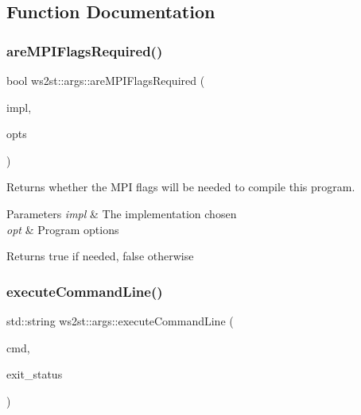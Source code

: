 \subsection{Function Documentation}
\mbox{\label{namespacews2st_1_1args_afdfeac88d594e9f636a020e576e99505}} 
\subsubsection{\texorpdfstring{are\+M\+P\+I\+Flags\+Required()}{areMPIFlagsRequired()}}
{\footnotesize\ttfamily bool ws2st\+::args\+::are\+M\+P\+I\+Flags\+Required (\begin{DoxyParamCaption}\item[{\mbox{\hyperlink{common_8hpp_aad9d1428f17c06ff77ef15dea22624dc}{Implementations}}}]{impl,  }\item[{const \mbox{\hyperlink{structWashOptions}{Wash\+Options}} \&}]{opts }\end{DoxyParamCaption})}



Returns whether the M\+PI flags will be needed to compile this program. 


\begin{DoxyParams}{Parameters}
{\em impl} & The implementation chosen \\
\hline
{\em opt} & Program options \\
\hline
\end{DoxyParams}
\begin{DoxyReturn}{Returns}
true if needed, false otherwise 
\end{DoxyReturn}
\mbox{\label{namespacews2st_1_1args_a759526679dc8b6662355746dfd34e586}} 
\subsubsection{\texorpdfstring{execute\+Command\+Line()}{executeCommandLine()}\hspace{0.1cm}{\footnotesize\ttfamily [1/2]}}
{\footnotesize\ttfamily std\+::string ws2st\+::args\+::execute\+Command\+Line (\begin{DoxyParamCaption}\item[{const std\+::string}]{cmd,  }\item[{int $\ast$}]{exit\+\_\+status }\end{DoxyParamCaption})}

